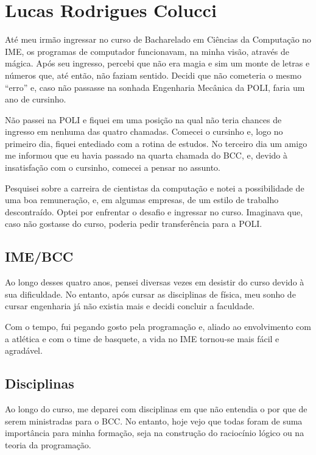 \newpage
\section{Lucas Rodrigues Colucci}
\label{sec:lucas_subjetiva}

Até meu irmão ingressar no curso de Bacharelado em Ciências da Computação no IME, os programas de
computador funcionavam, na minha visão, através de mágica. Após seu ingresso, percebi que não era
magia e sim um monte de letras e números que, até então, não faziam sentido. Decidi que não
cometeria o mesmo ``erro'' e, caso não passasse na sonhada Engenharia Mecânica da POLI, faria um ano
de cursinho.

Não passei na POLI e fiquei em uma posição na qual não teria chances de ingresso em nenhuma das
quatro chamadas. Comecei o cursinho e, logo no primeiro dia, fiquei entediado com a rotina de
estudos. No terceiro dia um amigo me informou que eu havia passado na quarta chamada do BCC, e,
devido à insatisfação com o cursinho, comecei a pensar no assunto.

Pesquisei sobre a carreira de cientistas da computação e notei a possibilidade de uma boa
remuneração, e, em algumas empresas, de um estilo de trabalho descontraído. Optei por enfrentar o
desafio e ingressar no curso. Imaginava que, caso não gostasse do curso, poderia pedir transferência
para a POLI.

\subsection{IME/BCC}

Ao longo desses quatro anos, pensei diversas vezes em desistir do curso devido à sua dificuldade. No
entanto, após cursar as disciplinas de física, meu sonho de cursar engenharia já não existia mais e
decidi concluir a faculdade.

Com o tempo, fui pegando gosto pela programação e, aliado ao envolvimento com a atlética e com o
time de basquete, a vida no IME tornou-se mais fácil e agradável.


\subsection{Disciplinas}

Ao longo do curso, me deparei com disciplinas em que não entendia o por que de serem ministradas
para o BCC. No entanto, hoje vejo que todas foram de suma importância para minha formação, seja na
construção do raciocínio lógico ou na teoria da programação.

